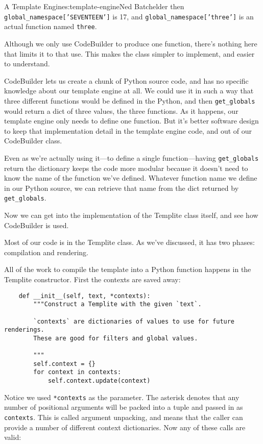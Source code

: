 \begin{aosachapter}{A Template Engine}{s:template-engine}{Ned Batchelder}
then \texttt{global\_namespace{[}'SEVENTEEN'{]}} is 17, and
\texttt{global\_namespace{[}'three'{]}} is an actual function named
\texttt{three}.

Although we only use CodeBuilder to produce one function, there's
nothing here that limits it to that use. This makes the class simpler to
implement, and easier to understand.

CodeBuilder lets us create a chunk of Python source code, and has no
specific knowledge about our template engine at all. We could use it in
such a way that three different functions would be defined in the
Python, and then \texttt{get\_globals} would return a dict of three
values, the three functions. As it happens, our template engine only
needs to define one function. But it's better software design to keep
that implementation detail in the template engine code, and out of our
CodeBuilder class.

Even as we're actually using it---to define a single function---having
\texttt{get\_globals} return the dictionary keeps the code more modular
because it doesn't need to know the name of the function we've defined.
Whatever function name we define in our Python source, we can retrieve
that name from the dict returned by \texttt{get\_globals}.

Now we can get into the implementation of the Templite class itself, and
see how CodeBuilder is used.

\label{the-templite-class-implementation}

Most of our code is in the Templite class. As we've discussed, it has
two phases: compilation and rendering.

\label{compiling}

All of the work to compile the template into a Python function happens
in the Templite constructor. First the contexts are saved away:

\begin{verbatim}
    def __init__(self, text, *contexts):
        """Construct a Templite with the given `text`.

        `contexts` are dictionaries of values to use for future renderings.
        These are good for filters and global values.

        """
        self.context = {}
        for context in contexts:
            self.context.update(context)
\end{verbatim}

Notice we used \texttt{*contexts} as the parameter. The asterisk denotes
that any number of positional arguments will be packed into a tuple and
passed in as \texttt{contexts}. This is called argument unpacking, and
means that the caller can provide a number of different context
dictionaries. Now any of these calls are valid:


\end{aosachapter}
